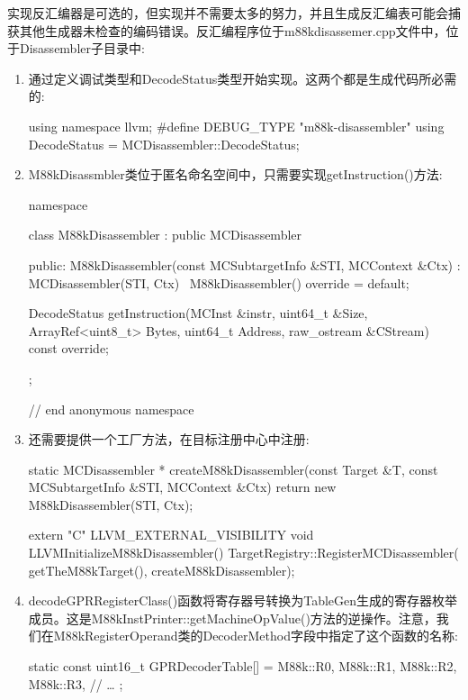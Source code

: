 实现反汇编器是可选的，但实现并不需要太多的努力，并且生成反汇编表可能会捕获其他生成器未检查的编码错误。反汇编程序位于m88kdisassemer.cpp文件中，位于Disassembler子目录中:

\begin{enumerate}
\item
通过定义调试类型和DecodeStatus类型开始实现。这两个都是生成代码所必需的:

\begin{cpp}
using namespace llvm;
#define DEBUG_TYPE "m88k-disassembler"
using DecodeStatus = MCDisassembler::DecodeStatus;
\end{cpp}

\item
M88kDisassmbler类位于匿名命名空间中，只需要实现getInstruction()方法:

\begin{cpp}
namespace {
class M88kDisassembler : public MCDisassembler {
public:
    M88kDisassembler(const MCSubtargetInfo &STI,
                     MCContext &Ctx)
        : MCDisassembler(STI, Ctx) {}
    ~M88kDisassembler() override = default;

    DecodeStatus
    getInstruction(MCInst &instr, uint64_t &Size,
                    ArrayRef<uint8_t> Bytes,
                    uint64_t Address,
                    raw_ostream &CStream) const override;
};
} // end anonymous namespace
\end{cpp}

\item
还需要提供一个工厂方法，在目标注册中心中注册:

\begin{cpp}
static MCDisassembler *
createM88kDisassembler(const Target &T,
                        const MCSubtargetInfo &STI,
                        MCContext &Ctx) {
    return new M88kDisassembler(STI, Ctx);
}

extern "C" LLVM_EXTERNAL_VISIBILITY void
LLVMInitializeM88kDisassembler() {
    TargetRegistry::RegisterMCDisassembler(
        getTheM88kTarget(), createM88kDisassembler);
}
\end{cpp}

\item
decodeGPRRegisterClass()函数将寄存器号转换为TableGen生成的寄存器枚举成员。这是M88kInstPrinter::getMachineOpValue()方法的逆操作。注意，我们在M88kRegisterOperand类的DecoderMethod字段中指定了这个函数的名称:

\begin{cpp}
static const uint16_t GPRDecoderTable[] = {
    M88k::R0, M88k::R1, M88k::R2, M88k::R3,
    // …
};


\end{cpp}
\end{enumerate}
